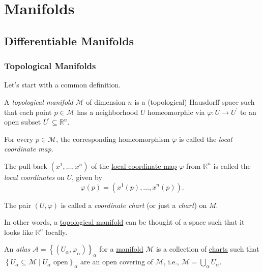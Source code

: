 \chapter{Manifolds}
\section{Differentiable Manifolds}
\subsection{Topological Manifolds}
Let's start with a common definition.

\begin{definition}\label{def:topological-manifold}
	A \emph{topological manifold} \(\mathcal{M} \) of dimension \(n\) is a (topological) Hausdorff space such that each point \(p\in \mathcal{M} \) has a neighborhood \(U\) homeomorphic via \(\varphi\colon U \to U^\prime \) to an open subset \(U^\prime \subseteq \mathbb{R} ^n\).
	\begin{definition}\label{def:local-coordinate-map}
		For every \(p\in \mathcal{M} \), the corresponding homeomorphism \(\varphi \) is called the \emph{local coordinate map}.
	\end{definition}
	\begin{definition}\label{def:local-coordinate}
		The pull-back \((x^1, \ldots , x^n)\) of the \hyperref[def:local-coordinate-map]{local coordinate map} \(\varphi \) from \(\mathbb{R} ^n\) is called the \emph{local coordinates} on \(U\), given by
		\[
			\varphi (p) = (x^1(p), \ldots , x^n(p)).
		\]
	\end{definition}
	\begin{definition}\label{def:coordinate-chart}
		The pair \((U, \varphi )\) is called a \emph{coordinate chart} (or just a \emph{chart}) on \(M\).
	\end{definition}
\end{definition}

In other words, a \hyperref[def:topological-manifold]{topological manifold} can be thought of a space such that it looks like \(\mathbb{R} ^n\) locally.

\begin{center}
\end{center}

\begin{definition}[Atlas]\label{def:atlas}
	An \emph{atlas} \(\mathcal{A} = \left\{ (U_\alpha , \varphi _\alpha) \right\}_\alpha \) for a \hyperref[def:topological-manifold]{manifold} \(\mathcal{M}\) is a collection of \hyperref[def:coordinate-chart]{charts} such that \(\left\{ U_\alpha\subseteq \mathcal{M} \mid U_\alpha \text{ open} \right\} _\alpha \) are an open covering of \(\mathcal{M} \), i.e., \(\mathcal{M} = \bigcup_{\alpha } U_\alpha \).
\end{definition}

